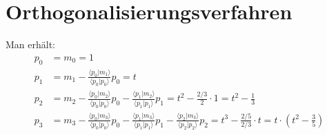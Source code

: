 \documentclass[a4paper,12pt]{article}
\newcommand{\brak}{}
\newcommand{\kla}{}
\begin{document}
\section{Orthogonalisierungsverfahren}
Man erhält:
\begin{align*}
p_0&=m_0=1\\
p_1&=m_1-\frac{\brak\langle {p_0}| {m_1}\rangle}{\brak\langle {p_0}| {p_0}\rangle}p_0=t\\
p_2&=m_2-\frac{\brak\langle {p_0}| {m_2}\rangle}{\brak\langle {p_0}| {p_0}\rangle}p_0-\frac{\brak\langle {p_1}| {m_2}\rangle}{\brak\langle {p_1}| {p_1}\rangle}p_1=t^2-\frac{2/3}{2}\cdot 1=t^2-\frac{1}{3}\\
p_3&=m_3-\frac{\brak\langle {p_0}| {m_3}\rangle}{\brak\langle {p_0}| {p_0}\rangle}p_0-\frac{\brak\langle {p_1}| {m_3}\rangle}{\brak\langle {p_1}| {p_1}\rangle}p_1-\frac{\brak\langle {p_2}| {m_3}\rangle}{\brak\langle {p_2}| {p_2}\rangle}p_2=t^3-\frac{2/5}{2/3}\cdot t=t\cdot\kla\left( {t^2-\frac{3}{5}} \right)
\end{align*}
\end{document}
